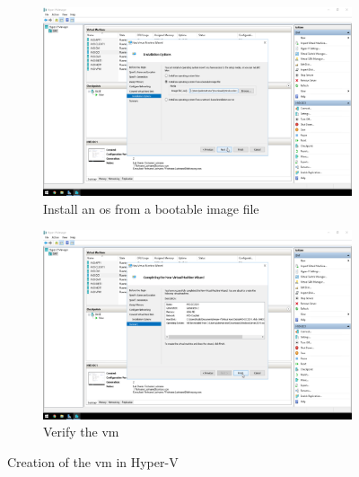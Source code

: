 \begin{figure}[!htb]\ContinuedFloat
	\begin{subfigure}{0.5\textwidth}
		\captionsetup{width=0.8\linewidth}
		\includegraphics[width=0.9\linewidth]{img/Methodologie/Migration2.png}
		\centering
		\caption{Install an \acrshort{os} from a bootable image file}
	\end{subfigure}
	\begin{subfigure}{0.5\textwidth}
		\captionsetup{width=0.8\linewidth}
		\includegraphics[width=0.9\linewidth]{img/Methodologie/Migration3.png} 
		\centering	
		\caption{Verify the \acrshort{vm}}
	\end{subfigure}
	\caption[\acrshort{vm} creation]{Creation of the \acrshort{vm} in Hyper-V}
	\label{fig:VMCreation}
\end{figure}
